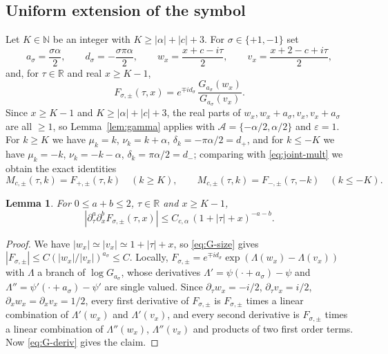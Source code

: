 \documentclass[11pt,a4paper,reqno,backref=page]{amsart}
\newcommand{\R}{\mathbb R}
\newcommand{\N}{\mathbb N}
\numberwithin{equation}{section}
\newtheorem{lemma}[theorem]{Lemma}
\theoremstyle{definition}
\theoremstyle{remark}
\begin{document}
\subsection{Uniform extension of the symbol}
Let $K\in\N$ be an integer with $K\ge|\alpha|+|c|+3$. For
$\sigma\in\{+1,-1\}$ set
\begin{equation}\label{eq:aux}
  a_\sigma=\frac{\sigma\alpha}{2},\qquad
  d_\sigma=-\frac{\sigma\pi\alpha}{2},\qquad
  w_x=\frac{x+c-i\tau}{2},\qquad
  v_x=\frac{x+2-c+i\tau}{2},
\end{equation}
and, for $\tau\in\R$ and real $x\ge K-1$,
\begin{equation}\label{eq:F}
  F_{\sigma,\pm}(\tau,x)=e^{\mp
  id_\sigma}\,\frac{G_{a_\sigma}(w_x)}{G_{a_\sigma}(v_x)}.
\end{equation}
Since $x\ge K-1$ and $K\ge|\alpha|+|c|+3$, the real parts of
$w_x,w_x+a_\sigma,v_x,v_x+a_\sigma$ are all $\ge1$, so
Lemma~\ref{lem:gamma} applies with $\mathcal
A=\{-\alpha/2,\alpha/2\}$ and $\varepsilon=1$. For $k\ge K$ we
have $\mu_k=k$, $\nu_k=k+\alpha$, $\delta_k=-\pi\alpha/2=d_+$,
and for $k\le-K$ we have $\mu_k=-k$, $\nu_k=-k-\alpha$,
$\delta_k=\pi\alpha/2=d_-$; comparing with \eqref{eq:joint-mult}
we obtain the exact identities
\begin{equation}\label{eq:exact-tail}
  M_{c,\pm}(\tau,k)=F_{+,\pm}(\tau,k)\quad(k\ge K),\qquad
  M_{c,\pm}(\tau,k)=F_{-,\pm}(\tau,-k)\quad(k\le-K).
\end{equation}

\begin{lemma}\label{lem:mixed}
For $0\le a+b\le2$, $\tau\in\R$ and $x\ge K-1$,
\begin{equation}\label{eq:mixed-est}
  |\partial_\tau^a\partial_x^bF_{\sigma,\pm}(\tau,x)|
  \le C_{c,\alpha}\,(1+|\tau|+x)^{-a-b}.
\end{equation}
\end{lemma}


\begin{proof}
We have $|w_x|\simeq|v_x|\simeq1+|\tau|+x$, so \eqref{eq:G-size}
gives $|F_{\sigma,\pm}|\le C(|w_x|/|v_x|)^{a_\sigma}\le C$.
Locally, $F_{\sigma,\pm}=e^{\mp
id_\sigma}\exp(\Lambda(w_x)-\Lambda(v_x))$ with $\Lambda$ a
branch of $\log G_{a_\sigma}$, whose derivatives
$\Lambda'=\psi(\cdot+a_\sigma)-\psi$ and
$\Lambda''=\psi'(\cdot+a_\sigma)-\psi'$ are single valued. Since
$\partial_\tau w_x=-i/2$, $\partial_\tau v_x=i/2$,
$\partial_xw_x=\partial_xv_x=1/2$, every first derivative of
$F_{\sigma,\pm}$ is $F_{\sigma,\pm}$ times a linear combination
of $\Lambda'(w_x)$ and $\Lambda'(v_x)$, and every second
derivative is $F_{\sigma,\pm}$ times a linear combination of
$\Lambda''(w_x)$, $\Lambda''(v_x)$ and products of two first
order terms. Now \eqref{eq:G-deriv} gives the claim.
\end{proof}
\end{document}
